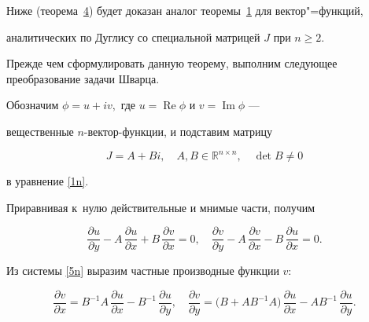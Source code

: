 \smallskip




Ниже (теорема~\hyperlink{nik:th4}{4}) будет доказан аналог теоремы~\hyperlink{nik:th1}{1}  для  вектор"=функций,

аналитических по Дуглису со специальной матрицей $J$ при $n\ge 2.$ 

Прежде чем сформулировать данную теорему, выполним следующее преобразование задачи Шварца.





Обозначим $\phi=u+iv,$ где $u=\mathop{\mathrm{Re}}\phi$ и $v=\mathop{\mathrm{Im}}\phi$ ---

 вещественные $n$-вектор-функции,  и подставим матрицу

 \begin{equation}

J=A+Bi,\quad A,B\in\mathbb{R}^{n\times n},\quad \det B\ne 0

\label{4n}

\end{equation}

  в уравнение  \eqref{1n}.  

  Приравнивая к~нулю действительные и мнимые части, получим

\begin{equation}

     \frac{\partial u}{\partial y}-A \,\frac{\partial u}{\partial x}

+B\, \frac{\partial v}{\partial x}=0,\quad

\frac{\partial v}{\partial y}-A\, \frac{\partial v}{\partial x}

-B\, \frac{\partial u}{\partial x}=0.

\label{5n}

\end{equation}





Из  системы \eqref{5n}  выразим частные производные функции $v$:

\begin{equation}

\frac{\partial v}{\partial x}=B^{-1}A\,\frac{\partial u}{\partial x}

-B^{-1}\,\frac{\partial u}{\partial y},\quad

\frac{\partial v}{\partial y}=\bigr(B+AB^{-1}A\bigr)\,

\frac{\partial u}{\partial x}-

AB^{-1}\,\frac{\partial u}{\partial y}.

\label{6n}

\end{equation}



